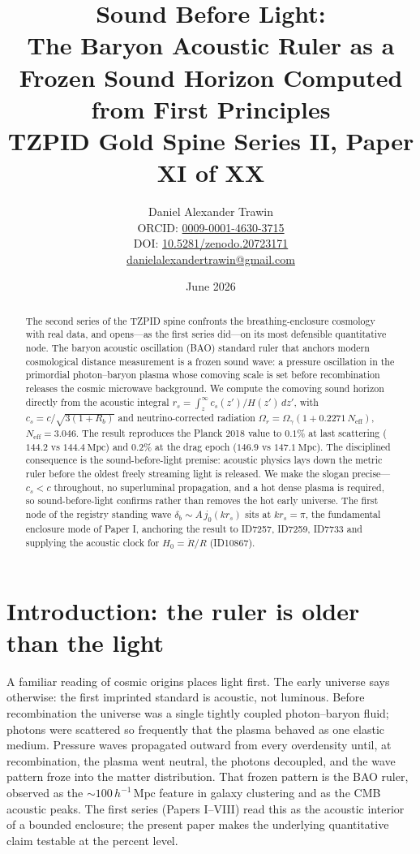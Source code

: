 \documentclass[11pt]{article}
\title{Sound Before Light:\\ The Baryon Acoustic Ruler as a Frozen Sound Horizon Computed from First Principles\\[0.6em]
\large TZPID Gold Spine Series II, Paper XI of XX}
\author{Daniel Alexander Trawin\\
\small ORCID: \href{https://orcid.org/0009-0001-4630-3715}{0009-0001-4630-3715}\\
\small DOI: \href{https://doi.org/10.5281/zenodo.20723171}{10.5281/zenodo.20723171}\\
\small \href{mailto:danielalexandertrawin@gmail.com}{danielalexandertrawin@gmail.com}}
\date{June 2026}
\theoremstyle{remark}
\newcommand{\Mpc}{\mathrm{Mpc}}
\begin{document}
\maketitle
\begin{abstract}
The second series of the TZPID spine confronts the breathing-enclosure cosmology with real data, and opens---as the first series did---on its most defensible quantitative node. The baryon acoustic oscillation (BAO) standard ruler that anchors modern cosmological distance measurement is a frozen sound wave: a pressure oscillation in the primordial photon--baryon plasma whose comoving scale is set before recombination releases the cosmic microwave background. We compute the comoving sound horizon directly from the acoustic integral $r_s = \int_{z}^{\infty} c_s(z')/H(z')\,dz'$, with $c_s = c/\sqrt{3(1+R_b)}$ and neutrino-corrected radiation $\Omega_r = \Omega_\gamma(1+0.2271\,N_{\mathrm{eff}})$, $N_{\mathrm{eff}}=3.046$. The result reproduces the Planck 2018 value to $0.1\%$ at last scattering ($144.2$ vs $144.4\ \Mpc$) and $0.2\%$ at the drag epoch ($146.9$ vs $147.1\ \Mpc$). The disciplined consequence is the sound-before-light premise: acoustic physics lays down the metric ruler before the oldest freely streaming light is released. We make the slogan precise---$c_s<c$ throughout, no superluminal propagation, and a hot dense plasma is required, so sound-before-light confirms rather than removes the hot early universe. The first node of the registry standing wave $\delta_b \sim A\,j_0(k r_s)$ sits at $k r_s = \pi$, the fundamental enclosure mode of Paper I, anchoring the result to ID7257, ID7259, ID7733 and supplying the acoustic clock for $H_0 = \dot R/R$ (ID10867).
\end{abstract}
\section{Introduction: the ruler is older than the light}
A familiar reading of cosmic origins places light first. The early universe says otherwise: the first imprinted standard is acoustic, not luminous. Before recombination the universe was a single tightly coupled photon--baryon fluid; photons were scattered so frequently that the plasma behaved as one elastic medium. Pressure waves propagated outward from every overdensity until, at recombination, the plasma went neutral, the photons decoupled, and the wave pattern froze into the matter distribution. That frozen pattern is the BAO ruler, observed as the $\sim 100\,h^{-1}\,\Mpc$ feature in galaxy clustering and as the CMB acoustic peaks. The first series (Papers I--VIII) read this as the acoustic interior of a bounded enclosure; the present paper makes the underlying quantitative claim testable at the percent level.
\end{document}
